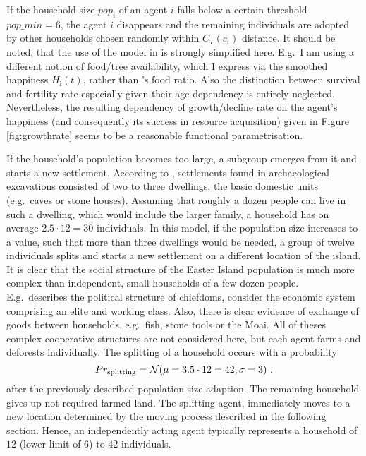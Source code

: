 If the household size $pop_i$ of an agent $i$ falls below a certain threshold $pop\_min = 6$, the agent $i$ disappears and the remaining individuals are adopted by other households chosen randomly within $C_T(c_i)$ distance. \TODO
It should be noted, that the use of the model in \citet{Pulestion2017} is strongly simplified here.
E.g.\ I am using a different notion of food/tree availability, which I express via the smoothed happiness $H_\text{i}(t)$, rather than \citet{Puleston2017}'s food ratio.
Also the distinction between survival and fertility rate especially given their age-dependency is entirely neglected.
Nevertheless, the resulting dependency of growth/decline rate on the agent's happiness (and consequently its success in resource acquisition) given in Figure \ref{fig:growthrate} seems to be a reasonable functional parametrisation. 


If the household's population becomes too large, a subgroup emerges from it and starts a new settlement.
According to \citet{Bahn2017}, settlements found in archaeological excavations consisted of two to three dwellings, the basic domestic units (e.g.\ caves or stone houses). 
Assuming that roughly a dozen people can live in such a dwelling, which would include the larger family, a household has on average $2.5\cdot 12 = 30$ individuals.
In this model, if the population size increases to a value, such that more than three dwellings would be needed, a group of twelve individuals splits and starts a new settlement on a different location of the island. 
It is clear that the social structure of the Easter Island population is much more complex than independent, small households of a few dozen people. 
E.g.\ \citet{Cauwe2011}\TODO describes the political structure of chiefdoms, \citet{Puleston2017} consider the economic system comprising an elite and working class.
Also, there is clear evidence of exchange of goods between households, e.g.\ fish, stone tools or the Moai.
All of theses complex cooperative structures are not considered here, but each agent farms and deforests individually.
The splitting of a household occurs with a probability 
\begin{equation}
Pr_{\rm splitting} = \mathcal{N}( \mu = 3.5 \cdot 12 = 42, \sigma = 3)\ .
\end{equation}
after the previously described population size adaption.
The remaining household gives up not required farmed land.
The splitting agent, immediately moves to a new location determined by the moving process described in the following section.
Hence, an independently acting agent typically represents a household of $12$ (lower limit of $6$) to $42$ individuals.


